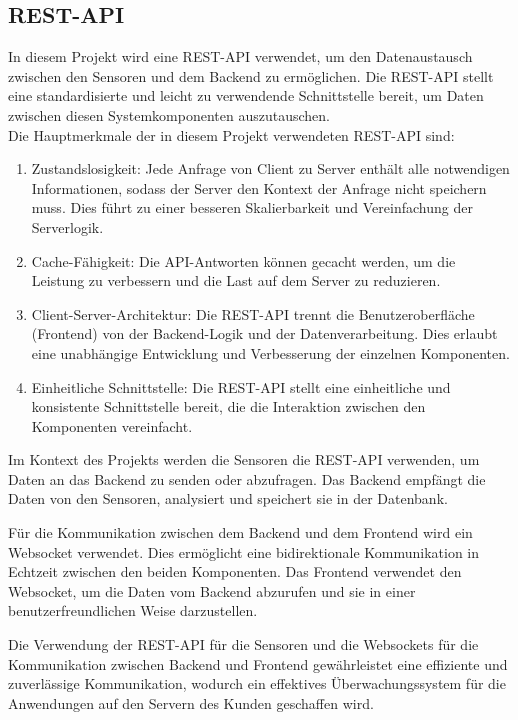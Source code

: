 \begin{flushleft}
		\subsection{REST-API}
			In diesem Projekt wird eine \acs{REST-API} verwendet, um den Datenaustausch zwischen den Sensoren und dem Backend zu ermöglichen. Die \acs{REST-API} stellt eine standardisierte und leicht zu verwendende Schnittstelle bereit, um Daten zwischen diesen Systemkomponenten auszutauschen.
			\\
			Die Hauptmerkmale der in diesem Projekt verwendeten \acs{REST-API} sind:
			\begin{enumerate}
				\item Zustandslosigkeit: Jede Anfrage von Client zu Server enthält alle notwendigen Informationen, sodass der Server den Kontext der Anfrage nicht speichern muss. Dies führt zu einer besseren Skalierbarkeit und Vereinfachung der Serverlogik.
				\item Cache-Fähigkeit: Die API-Antworten können gecacht werden, um die Leistung zu verbessern und die Last auf dem Server zu reduzieren.
				\item Client-Server-Architektur: Die \acs{REST-API} trennt die Benutzeroberfläche (Frontend) von der Backend-Logik und der Datenverarbeitung. Dies erlaubt eine unabhängige Entwicklung und Verbesserung der einzelnen Komponenten.
				\item Einheitliche Schnittstelle: Die \acs{REST-API} stellt eine einheitliche und konsistente Schnittstelle bereit, die die Interaktion zwischen den Komponenten vereinfacht.
			\end{enumerate}

			Im Kontext des Projekts werden die Sensoren die \acs{REST-API} verwenden, um Daten an das Backend zu senden oder abzufragen. Das Backend empfängt die Daten von den Sensoren, analysiert und speichert sie in der Datenbank.

			Für die Kommunikation zwischen dem Backend und dem Frontend wird ein Websocket verwendet. Dies ermöglicht eine bidirektionale Kommunikation in Echtzeit zwischen den beiden Komponenten. Das Frontend verwendet den Websocket, um die Daten vom Backend abzurufen und sie in einer benutzerfreundlichen Weise darzustellen.

			Die Verwendung der \acs{REST-API} für die Sensoren und die Websockets für die Kommunikation zwischen Backend und Frontend gewährleistet eine effiziente und zuverlässige Kommunikation, wodurch ein effektives Überwachungssystem für die Anwendungen auf den Servern
			des Kunden geschaffen wird.



\end{flushleft}
